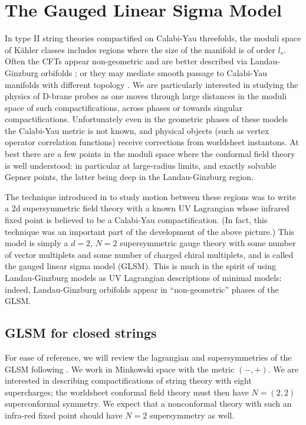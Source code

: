 \documentclass[a4paper,12pt]{article}
\begin{document}
\section{The Gauged Linear Sigma Model}

In type II string theories compactified on Calabi-Yau threefolds, the
moduli space of K\"ahler classes includes regions where the size of the
manifold is of order $l_s$.  Often the CFTs appear non-geometric and are
better described via Landau-Ginzburg orbifolds \cite{wittenphases,ag}; or
they may mediate smooth passage to Calabi-Yau manifolds with different
topology \cite{agm}. We are particularly interested in studying the
physics of D-brane probes as one moves through large distances in the
moduli space of such compactifications, across phases or towards singular
compactifications.  Unfortunately even in the geometric phases of these
models the Calabi-Yau metric is not known, and physical objects (such as
vertex operator correlation functions) receive corrections from worldsheet
instantons. At best there are a few points in the moduli space where the
conformal field theory is well understood: in particular at large-radius
limits, and exactly solvable Gepner points, the latter being deep in the
Landau-Ginzburg region. 

The technique introduced in \cite{wittenphases} to study motion between
these regions was to write a 2d supersymmetric field theory with a known
UV Lagrangian whose infrared fixed point is believed to be a Calabi-Yau
compactification. (In fact, this technique was an important part of the
development of the above picture.) This model is simply a $d=2$, $N=2$
supersymmetric gauge theory with some number of vector multiplets and some
number of charged chiral multiplets, and is called the gauged linear sigma
model (GLSM). This is much in the spirit of using Landau-Ginzburg models
as UV Lagrangian descriptions of minimal models: indeed, Landau-Ginzburg
orbifolds appear in ``non-geometric'' phases of the GLSM. 

\subsection{GLSM for closed strings}

For ease of reference, we will review the lagrangian and
supersymmetries of the GLSM following \cite{wittenphases}.  We work in
Minkowski space with the metric $(-,+)$.  We are interested in describing
compactifications of string theory with eight supercharges; the worldsheet
conformal field theory must then have $N=(2,2)$ superconformal symmetry. 
We expect that a nonconformal theory with such an infra-red fixed
point should have $N=2$ supersymmetry as well. 
\end{document}
